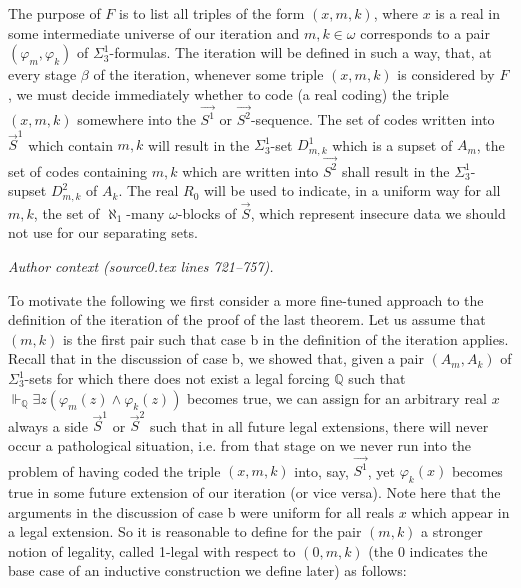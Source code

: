\documentclass[10pt,a4paper]{amsart}
\newcommand{\forceQ}{\mathbb{Q}}
\begin{document}
The purpose of $F$ is to list all triples of the form $(x,m,k)$, where $x$ is a real in some intermediate universe of our iteration and $m,k \in \omega$ corresponds to a pair $(\varphi_m,\varphi_k)$ of $\Sigma^1_3$-formulas. The iteration will be defined in such a way, that, at every stage $\beta$ of the iteration, whenever some triple $(x,m,k)$ is considered by $F$, we must decide immediately whether to code (a real coding) the triple $(x,m,k)$ somewhere into the $\vec{S^1}$ or $\vec{S^2}$-sequence. The set of codes written into $\vec{S}^1$ which contain $m,k$ will result in the $\Sigma^1_3$-set $D^1_{m,k}$ which is a supset of $A_m$, the set of codes containing $m,k$ which are written into $\vec{S^2}$ shall result in the $\Sigma^1_3$-supset $D^2_{m,k}$ of $A_k$. The real $R_0$ will be used to indicate, in a uniform way for all $m,k$, the set of $\aleph_1$-many $\omega$-blocks of $\vec{S}$, which represent insecure data  we should not use for our separating sets.
\par\medskip\noindent\textit{Author context (source0.tex lines 721--757).}\par\smallskip
To motivate the following we first consider a more fine-tuned approach to the definition of the iteration of the proof of the last theorem. Let us assume that $(m,k)$ is the first pair such that case b in the definition of the iteration applies. Recall that in the discussion of case b, we showed that, given a pair $(A_m, A_k)$ of $\Sigma^1_3$-sets for which there does not exist a legal forcing $\forceQ$ such that $\Vdash_{\forceQ} \exists z (\varphi_m(z) \land \varphi_k(z))$ becomes true, we can assign for an arbitrary real $x$ always a side $\vec{S}^1$ or $\vec{S}^2$ such that in all future legal extensions, there will never occur a pathological situation, i.e. from that stage on we never run into the problem of having coded the triple $(x,m,k)$ into, say, $\vec{S^1}$, yet $\varphi_k(x)$ becomes true in some future extension of our iteration (or vice versa). Note here that the arguments in the discussion of case b were uniform for all reals $x$ which appear in a legal extension. So it is reasonable to define for the pair $(m,k)$ 
a stronger notion of legality, called 1-legal with respect to $(0,m,k)$ (the 0 indicates the base case of an inductive construction we define later) as follows:
\end{document}
